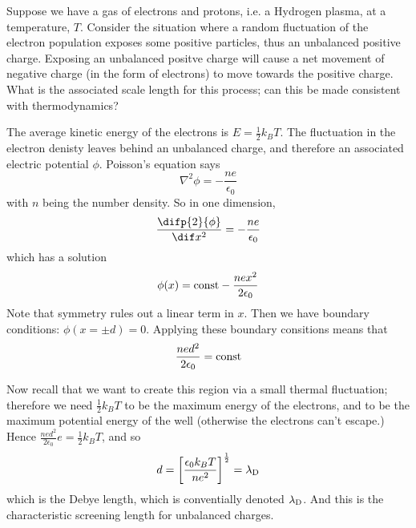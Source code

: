 \documentclass{book}         		                %
\begin{document}
Suppose we have a gas of electrons and protons, i.e. a Hydrogen
plasma, at a temperature, $T$. Consider the situation where a random
fluctuation of the electron population exposes some positive
particles, thus an unbalanced positive charge. Exposing an unbalanced
positve charge will cause a net movement of negative charge (in the
form of electrons) to move towards the positive charge.  What is the
associated scale length for this process; can this be made consistent
with thermodynamics?
\begin{center}

\end{center}
The average kinetic energy of the electrons is $E = \frac{1}{2} k_{B
}T$. The fluctuation in the electron denisty leaves behind an
unbalanced charge, and therefore an associated electric potential
$\phi$. Poisson's equation says
\[ \nabla^2 \phi = - \frac{ne}{\epsilon_{0}} \]
with $n$ being the number density. So in one dimension, 
\[ \frac{\difp{2} {\phi}}{\dif x^2} = - \frac{ne}{\epsilon_0} \]
which has a solution
\[ \phi(x) = {\rm const} - \frac{nex^2}{2 \epsilon_0} \] Note that
symmetry rules out a linear term in $x$.  Then we have boundary
conditions: $\phi(x=\pm d) = 0$.  Applying these boundary consitions
means that \[ \frac{ned^2}{2\epsilon_0} = {\rm const} \]

\begin{center}
\end{center}

Now recall that we want to create this region via a small thermal
fluctuation; therefore we need $\frac{1}{2} k_{B}T$ to be the maximum
energy of the electrons, and to be the maximum potential energy of the
well (otherwise the electrons can't escape.)  Hence
$\frac{ned^2}{2\epsilon_0} e = \frac{1}{2} k_BT$, and so 
\begin{equation}
d =\left[ \frac{\epsilon_0 k_BT}{ne^2} \right]^{\frac{1}{2}} = \lambda_{\rm D}
\end{equation}
which is the Debye length, which is conventially denoted
$\lambda_{{\rm D}}$.  And this is the characteristic screening length
for unbalanced charges.
\end{document}
